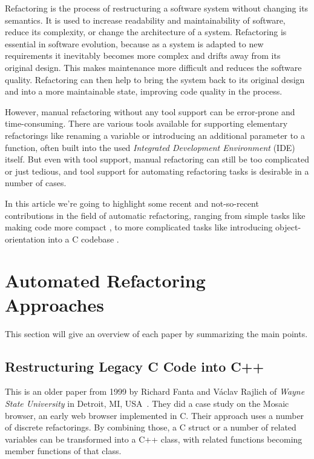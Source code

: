 \documentclass[conference,compsoc,a4paper]{IEEEtran}
\newcommand{\code}[1]{{\small\ttfamily #1}}
\begin{document}
Refactoring is the process of restructuring a software system without changing its semantics. It is used to increase 
readability and maintainability of software, reduce its complexity, or change the architecture of a system. Refactoring 
is essential in software evolution, because as a system is adapted to new requirements it inevitably becomes more 
complex and drifts away from its original design. This makes maintenance more difficult and reduces the software 
quality. Refactoring can then help to bring the system back to its original design and into a more maintainable state, 
improving code quality in the process.

However, manual refactoring without any tool support can be error-prone and time-consuming. There are various tools 
available for supporting elementary refactorings like renaming a variable or introducing an additional parameter to a 
function, often built into the used \emph{Integrated Development Environment} (IDE) itself. But even with tool support, 
manual refactoring can still be too complicated or just tedious, and tool support for automating refactoring tasks is 
desirable in a number of cases.

In this article we're going to highlight some recent and not-so-recent contributions in the field of automatic 
refactoring, ranging from simple tasks like making code more compact \cite{sparta}, to more complicated tasks like 
introducing object-orientation into a C codebase \cite{cpp}.


\section{Automated Refactoring Approaches}

This section will give an overview of each paper by summarizing the main points.

\subsection{Restructuring Legacy C Code into C++}

This is an older paper from 1999 by Richard Fanta and Václav Rajlich of \emph{Wayne State University} in Detroit, MI, 
USA~\cite{cpp}. They did a case study on the Mosaic browser, an early web browser implemented in C. Their approach uses 
a number of discrete refactorings. By combining those, a C \code{struct} or a number of related variables can be 
transformed into a C++ class, with related functions becoming member functions of that class.
\end{document}
